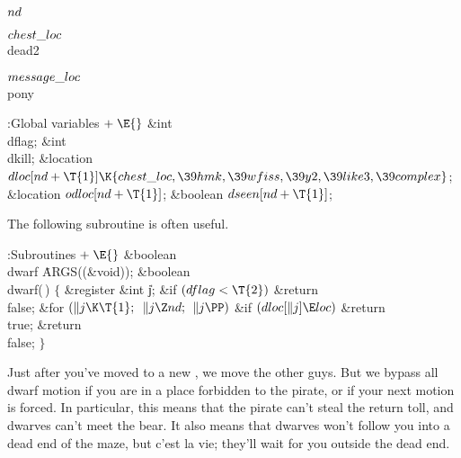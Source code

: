 \Y\B\4\D$\\{nd}$ \5
\par
\B\4\D$\\{chest\_loc}$ \5
\\{dead2}\par
\B\4\D$\\{message\_loc}$ \5
\\{pony}\par
\Y\B\4:Global variables\X${}\mathrel+\E{}$\6
\&{int} \\{dflag};\6
\&{int} \\{dkill};\6
\&{location} ${}\\{dloc}[\\{nd}+\T{1}]\K\{\\{chest\_loc},\39\\{hmk},\39%
\\{wfiss},\39\\{y2},\39\\{like3},\39\\{complex}\}{}$;\6
\&{location} ${}\\{odloc}[\\{nd}+\T{1}]{}$;\6
\&{boolean} ${}\\{dseen}[\\{nd}+\T{1}]{}$;\par
\fi

The following subroutine is often useful.

\Y\B\4:Subroutines\X${}\mathrel+\E{}$\6
\&{boolean} \\{dwarf}\,\,\.{ARGS}((\&{void}));\7
\&{boolean} \\{dwarf}(\,)\6
${}\{{}$\1\6
\&{register} \&{int} \|j;\7
\&{if} ${}(\\{dflag}<\T{2}){}$\1\5
\&{return} \\{false};\2\6
\&{for} ${}(\|j\K\T{1};{}$ ${}\|j\Z\\{nd};{}$ ${}\|j\PP){}$\1\6
\&{if} ${}(\\{dloc}[\|j]\E\\{loc}){}$\1\5
\&{return} \\{true};\2\2\6
\&{return} \\{false};\6
\4${}\}{}$\2\par
\fi

Just after you've moved to a new , we move
the other guys.
But we bypass all dwarf motion if you are in a place forbidden
to the pirate, or if your next motion is forced. In particular,
this means that the pirate can't steal the return toll, and
dwarves can't meet the bear.  It also means that dwarves won't
follow you into a dead end of the maze, but c'est la vie; they'll
wait for you outside the dead end.

